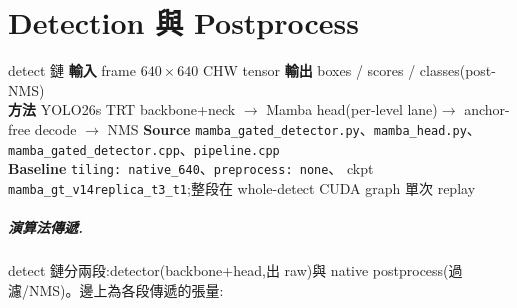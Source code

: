 \chapter{Detection 與 Postprocess}\label{ch:detect}

\begin{center}\end{center}

\begin{contract}{detect 鏈}
\textbf{輸入}\; frame \(640\times640\) CHW tensor\quad
\textbf{輸出}\; boxes / scores / classes(post-NMS)\\
\textbf{方法}\; YOLO26s TRT backbone+neck \(\to\) Mamba head(per-level lane)\(\to\)
anchor-free decode \(\to\) NMS\quad
\textbf{Source}\; \texttt{mamba\_gated\_detector.py}、\texttt{mamba\_head.py}、
\texttt{mamba\_gated\_detector.cpp}、\texttt{pipeline.cpp}\\
\textbf{Baseline}\; \texttt{tiling: native\_640}、\texttt{preprocess: none}、
ckpt \texttt{mamba\_gt\_v14replica\_t3\_t1};整段在 whole-detect CUDA graph 單次 replay
\end{contract}

\paragraph{演算法傳遞.} detect 鏈分兩段:detector(backbone+head,出 raw)與 native
postprocess(過濾/NMS)。邊上為各段傳遞的張量:

\begin{center}\end{center}

